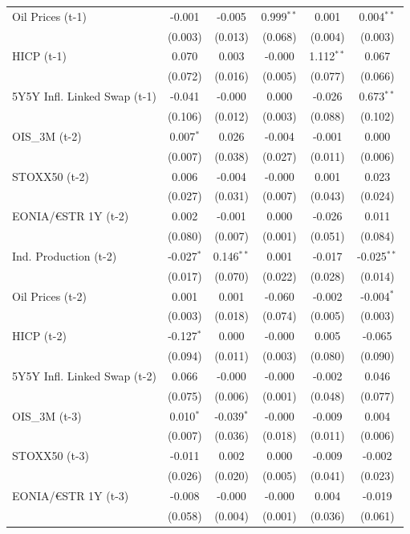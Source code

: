 \begin{longtable}[t]{lccccc}
Oil Prices (t-1) & -0.001 & -0.005 & 0.999$^{**}$ & 0.001 & 0.004$^{**}$\\
 & (0.003) & (0.013) & (0.068) & (0.004) & (0.003)\\
HICP (t-1) & 0.070 & 0.003 & -0.000 & 1.112$^{**}$ & 0.067\\
 & (0.072) & (0.016) & (0.005) & (0.077) & (0.066)\\
5Y5Y Infl. Linked Swap (t-1) & -0.041 & -0.000 & 0.000 & -0.026 & 0.673$^{**}$\\
 & (0.106) & (0.012) & (0.003) & (0.088) & (0.102)\\
OIS\_3M (t-2) & 0.007$^{*}$ & 0.026 & -0.004 & -0.001 & 0.000\\
 & (0.007) & (0.038) & (0.027) & (0.011) & (0.006)\\
STOXX50 (t-2) & 0.006 & -0.004 & -0.000 & 0.001 & 0.023\\
 & (0.027) & (0.031) & (0.007) & (0.043) & (0.024)\\
EONIA/€STR 1Y (t-2) & 0.002 & -0.001 & 0.000 & -0.026 & 0.011\\
 & (0.080) & (0.007) & (0.001) & (0.051) & (0.084)\\
Ind. Production (t-2) & -0.027$^{*}$ & 0.146$^{**}$ & 0.001 & -0.017 & -0.025$^{**}$\\
 & (0.017) & (0.070) & (0.022) & (0.028) & (0.014)\\
Oil Prices (t-2) & 0.001 & 0.001 & -0.060 & -0.002 & -0.004$^{*}$\\
 & (0.003) & (0.018) & (0.074) & (0.005) & (0.003)\\
HICP (t-2) & -0.127$^{*}$ & 0.000 & -0.000 & 0.005 & -0.065\\
 & (0.094) & (0.011) & (0.003) & (0.080) & (0.090)\\
5Y5Y Infl. Linked Swap (t-2) & 0.066 & -0.000 & -0.000 & -0.002 & 0.046\\
 & (0.075) & (0.006) & (0.001) & (0.048) & (0.077)\\
OIS\_3M (t-3) & 0.010$^{*}$ & -0.039$^{*}$ & -0.000 & -0.009 & 0.004\\
 & (0.007) & (0.036) & (0.018) & (0.011) & (0.006)\\
STOXX50 (t-3) & -0.011 & 0.002 & 0.000 & -0.009 & -0.002\\
 & (0.026) & (0.020) & (0.005) & (0.041) & (0.023)\\
EONIA/€STR 1Y (t-3) & -0.008 & -0.000 & -0.000 & 0.004 & -0.019\\
 & (0.058) & (0.004) & (0.001) & (0.036) & (0.061)\\

\end{longtable}

